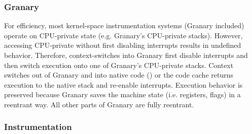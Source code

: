 \documentclass[preprint]{sigplanconf}
\begin{document}

\subsubsection{Granary}
For efficiency, most kernel-space instrumentation systems (Granary included) operate on CPU-private state (e.g. Granary's CPU-private stacks). However, accessing CPU-private without first disabling interrupts results in undefined behavior. Therefore, context-switches into Granary first disable interrupts and then switch execution onto one of Granary's CPU-private stacks. Context switches out of Granary and into native code () or the code cache returns execution to the native stack and re-enable interrupts. Execution behavior is preserved because Granary saves the machine state (i.e. registers, flags) in a reentrant way. All other parts of Granary are fully reentrant.




\subsubsection{Instrumentation}\label{sec:interrupt_delay}
\end{document}
